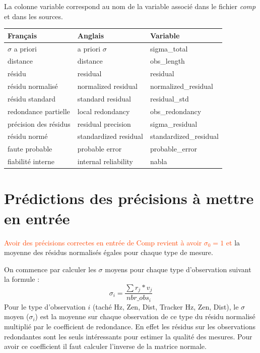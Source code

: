 \documentclass[french]{report}
\newcommand{\revoir}[1]{\textcolor{OrangeRed}{#1}}
\begin{document}
La colonne variable correspond au nom de la variable associé dans le fichier \textit{comp} et dans les sources.

\begin{center}
\begin{tabular}{|l|l|l|}
\hline
\textbf{Français} & \textbf{Anglais} & \textbf{Variable} \\ \hline
$\sigma$ a priori & a priori $\sigma$ & sigma\_total\\ \hline
distance & distance & obs\_length\\ \hline
résidu & residual & residual\\ \hline
résidu normalisé & normalized residual & normalized\_residual\\ \hline
résidu standard & standard residual & residual\_std\\ \hline
redondance partielle & local redondancy & obs\_redondancy\\ \hline
précision des résidus & residual precision & sigma\_residual\\ \hline
résidu normé & standardized residual & standardized\_residual\\ \hline
faute probable & probable error & probable\_error\\ \hline
fiabilité interne & internal reliability & nabla\\
\hline
\end{tabular}
\end{center}


\newpage

\section{Prédictions des précisions à mettre en entrée}
\revoir{Avoir des précisions correctes en entrée de Comp revient à avoir $\sigma_0=1$ et}
la moyenne des résidus normalisés égales pour chaque type de mesure.

On commence par calculer les $\sigma$ moyens pour chaque type d'observation suivant la formule :
$$ \sigma_i=\frac{\sum{r_j*v_j}}{nbr\_obs_i} $$
Pour le type d'observation $i$ (taché Hz, Zen, Dist, Tracker Hz, Zen, Dist), le $\sigma$ moyen ($ \sigma_i$)
est la moyenne sur chaque observation de ce type du résidu normalisé multiplié par le coefficient de
redondance.
En effet les résidus sur les observations redondantes sont les seuls intéressants pour estimer
la qualité des mesures. Pour avoir ce coefficient il faut calculer l'inverse de la matrice normale.
\end{document}
